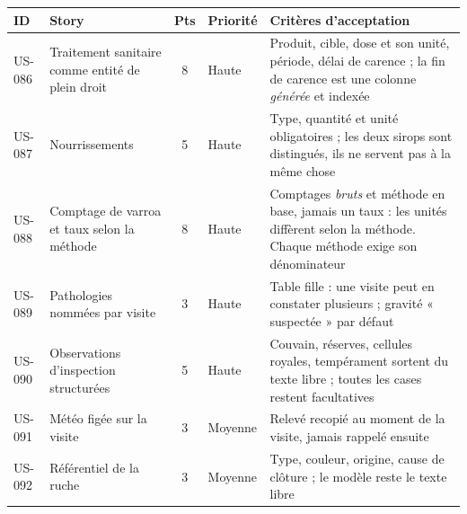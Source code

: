 \begin{center}
\begin{tabular}{lp{6.6cm}cl p{4.6cm}}
\toprule
\textbf{ID} & \textbf{Story} & \textbf{Pts} & \textbf{Priorité} & \textbf{Critères d'acceptation} \\
\midrule
US-086 & Traitement sanitaire comme entité de plein droit & 8 & Haute & Produit, cible, dose et son unité, période, délai de carence ; la fin de carence est une colonne \emph{générée} et indexée \\
US-087 & Nourrissements & 5 & Haute & Type, quantité et unité obligatoires ; les deux sirops sont distingués, ils ne servent pas à la même chose \\
US-088 & Comptage de varroa et taux selon la méthode & 8 & Haute & Comptages \emph{bruts} et méthode en base, jamais un taux : les unités diffèrent selon la méthode. Chaque méthode exige son dénominateur \\
US-089 & Pathologies nommées par visite & 3 & Haute & Table fille : une visite peut en constater plusieurs ; gravité « suspectée » par défaut \\
US-090 & Observations d'inspection structurées & 5 & Haute & Couvain, réserves, cellules royales, tempérament sortent du texte libre ; toutes les cases restent facultatives \\
US-091 & Météo figée sur la visite & 3 & Moyenne & Relevé recopié au moment de la visite, jamais rappelé ensuite \\
US-092 & Référentiel de la ruche & 3 & Moyenne & Type, couleur, origine, cause de clôture ; le modèle reste le texte libre \\
\bottomrule
\end{tabular}
\end{center}
